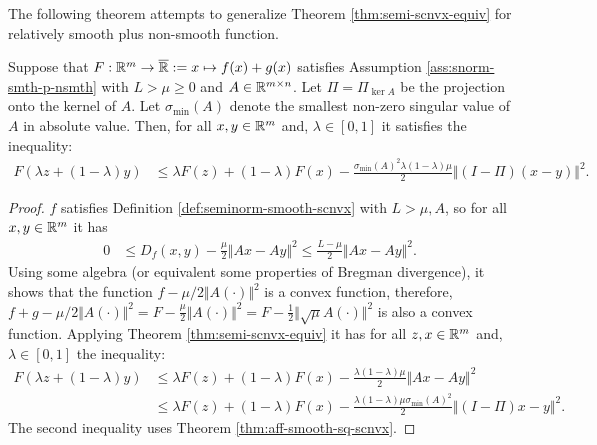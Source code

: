 \documentclass[12pt]{article}
\begin{document}
            The following theorem attempts to generalize Theorem \ref{thm:semi-scnvx-equiv} for relatively smooth plus non-smooth function. 
            \begin{theorem}\label{thm:smnrm-jnsn-smth-nsmth}
                Suppose that $F:\mathbb R^m \rightarrow \overline {\mathbb R} := x \mapsto f(x) + g(x)$ satisfies Assumption \ref{ass:snorm-smth-p-nsmth} with $L > \mu \ge 0$ and $A \in \mathbb R^{m\times n}$.
                Let $\Pi = \Pi_{\ker A}$ be the projection onto the kernel of $A$. 
                Let $\sigma_{\min}(A)$ denote the smallest non-zero singular value of $A$ in absolute value. 
                Then, for all $x, y \in \mathbb R^m$ and, $\lambda \in [0, 1]$ it satisfies the inequality: 
                \begin{align*}
                    F(\lambda z + (1 - \lambda)y) &\le \lambda F(z) + (1 - \lambda)F(x) - \frac{\sigma_{\min}(A)^2\lambda(1 - \lambda)\mu}{2}\Vert (I - \Pi)(x - y)\Vert^2. 
                \end{align*}
            \end{theorem}
            \begin{proof}
                $f$ satisfies Definition \ref{def:seminorm-smooth-scnvx} with $L > \mu, A$, so for all $x, y \in \mathbb R^m$ it has 
                \begin{align*}
                    0 &\le D_f(x, y) - \frac{\mu}{2}\Vert Ax - Ay\Vert^2 
                    \le \frac{L - \mu}{2}\Vert Ax - Ay\Vert^2. 
                \end{align*}
                Using some algebra (or equivalent some properties of Bregman divergence), it shows that the function $f - \mu/2 \Vert A(\cdot)\Vert^2$ is a convex function, therefore, $f + g - \mu/2\Vert A(\cdot)\Vert^2 = F - \frac{\mu}{2}\Vert A(\cdot)\Vert^2 = F - \frac{1}{2}\Vert \sqrt{\mu}A(\cdot)\Vert^2$ is also a convex function. 
                Applying Theorem \ref{thm:semi-scnvx-equiv} it has for all $z, x \in \mathbb R^m$ and, $\lambda \in [0, 1]$ the inequality: 
                \begin{align*}
                    F(\lambda z + (1 - \lambda)y) &\le \lambda F(z) + (1 - \lambda)F(x) - \frac{\lambda(1 - \lambda)\mu}{2}\Vert Ax - Ay\Vert^2
                    \\
                    &\le 
                    \lambda F(z) + (1 - \lambda)F(x) - \frac{\lambda(1 - \lambda)\mu\sigma_{\min}(A)^2}{2}\Vert (I - \Pi) x - y\Vert^2. 
                \end{align*}
                The second inequality uses Theorem \ref{thm:aff-smooth-sq-scnvx}. 
            \end{proof}
        
\end{document}
